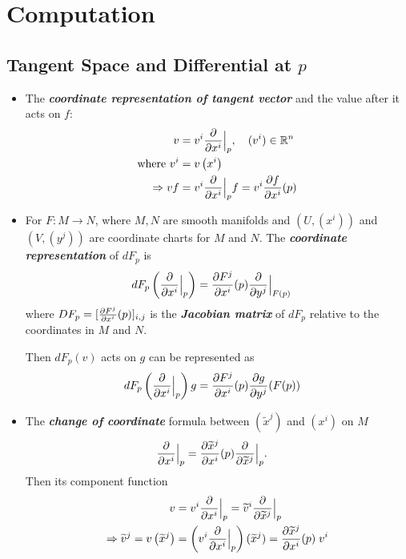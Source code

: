 \documentclass[11pt]{article}
\begin{document}
\newpage
\section{Computation}
\subsection{Tangent Space and Differential at $p$}
\begin{itemize}
\item The \emph{\textbf{coordinate representation of tangent vector}} and the value after it acts on $f$:
\begin{align}
v &= v^i \frac{\partial }{ \partial x^i}\Bigr|_{p}, \quad (v^i) \in {\mathbb R}^{n}  \label{eqn: tangent_vector_coordinate}\\
\text{where }v^i &= v\left(x^i\right) \nonumber\\
\Rightarrow vf &= v^i \frac{\partial }{ \partial x^i}\Bigr|_{p}f = v^i \frac{\partial f}{ \partial x^i}(p) \nonumber
\end{align}


\item For $F: M \rightarrow N$, where $M, N$ are smooth manifolds and $(U, (x^i))$ and $(V, (y^j))$ are coordinate charts for $M$ and $N$. The \emph{\textbf{coordinate representation}} of $dF_p$ is
\begin{align}
dF_p\left(\frac{\partial }{ \partial x^i}\Bigr|_{p}\right) &= \frac{\partial F^{j}}{ \partial x^i}(p)\frac{\partial }{ \partial y^j}\Bigr|_{F(p)}  \label{eqn: differential_at_p_jacobian_coordinate}
\end{align} where $DF_p = [\frac{\partial F^{j}}{ \partial x^i}(p)]_{i,j}$ is the \emph{\textbf{Jacobian matrix}} of $dF_p$ relative to the coordinates in $M$ and $N$.

Then $dF_p(v)$ acts on $g$ can be represented as 
\begin{align*}
dF_p\left(\frac{\partial }{ \partial x^i}\Bigr|_{p}\right)g &= \frac{\partial F^{j}}{ \partial x^i}(p)\frac{\partial g}{ \partial y^j}(F(p))
\end{align*}

\item The \emph{\textbf{change of coordinate}} formula between $(\widetilde{x}^{j})$ and $(x^i)$ on $M$
\begin{align}
\frac{\partial }{ \partial x^i}\Bigr|_{p} &= \frac{\partial \widetilde{x}^{j}}{ \partial x^i}(p)\frac{\partial }{ \partial \widetilde{x}^j}\Bigr|_{p}. \label{eqn: tangent_vector_change_coordinate}
\end{align} Then its component function
\begin{align}
v &= v^i \frac{\partial }{ \partial x^i}\Bigr|_{p} = \widetilde{v}^i\frac{\partial }{ \partial \widetilde{x}^j}\Bigr|_{p} \nonumber\\
\Rightarrow \widetilde{v}^j = v\left(\widetilde{x}^j\right) &= \left( v^i \frac{\partial }{ \partial x^i}\Bigr|_{p}\right)(\widetilde{x}^j) =\frac{\partial \widetilde{x}^j}{ \partial x^i}(p)\; v^i  \label{eqn: tangent_vector_change_coordinate_component}
\end{align}


\end{itemize}
\end{document}
